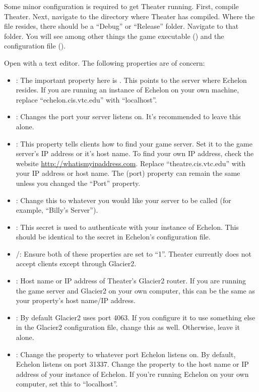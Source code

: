 Some minor configuration is required to get Theater running. First, compile Theater. Next, navigate to the directory where Theater has compiled. Where the file  resides, there should be a ``Debug'' or ``Release'' folder. Navigate to that folder. You will see among other things the game executable () and the configuration file ().

Open  with a text editor. The following properties are of concern:

\begin{itemize}
	\item {}: The important property here is . This points to the server where Echelon resides. If you are running an instance of Echelon on your own machine, replace ``echelon.cis.vtc.edu'' with ``localhost''.
	\item {}: Changes the port your server listens on. It's recommended to leave this alone.
	\item {}: This property tells clients how to find your game server. Set it to the game server's IP address or it's host name. To find your own IP address, check the website \url{http://whatismyipaddress.com}. Replace ``theatre.cis.vtc.edu'' with your IP address or host name. The  (port) property can remain the same unless you changed the ``Port'' property.
	\item {}: Change this to whatever you would like your server to be called (for example, ``Billy's Server'').
	\item {}: This secret is used to authenticate with your instance of Echelon. This should be identical to the secret in Echelon's configuration file.
	\item {}/: Ensure both of these properties are set to ``1''. Theater currently does not accept clients except through Glacier2.
	\item {}: Host name or IP address of Theater's Glacier2 router. If you are running the game server and Glacier2 on your own computer, this can be the same as your  property's host name/IP address.
	\item {}: By default Glacier2 uses port 4063. If you configure it to use something else in the Glacier2 configuration file, change this as well. Otherwise, leave it alone.
	\item {}: Change the  property to whatever port Echelon listens on. By default, Echelon listens on port 31337. Change the  property to the host name or IP address of your instance of Echelon. If you're running Echelon on your own computer, set this to ``localhost''.
\end{itemize}

